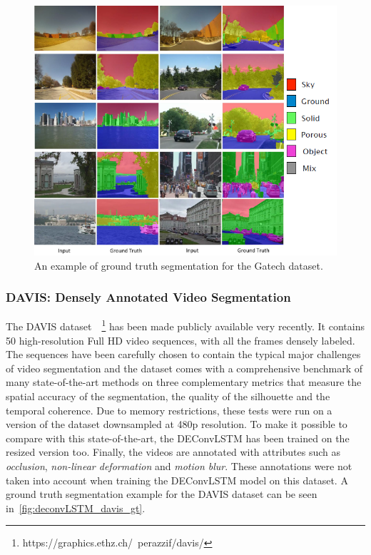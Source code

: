 \begin{figure}[t]
    \centering
    \includegraphics[width=\columnwidth]{img/deconvLSTM/gatech_gt.png}
    \caption{An example of ground truth segmentation for the Gatech dataset.}
    \label{fig:deconvLSTM_gatech_gt}
\end{figure}

\subsubsection{DAVIS: Densely Annotated Video Segmentation}
\label{sec:deconvLSTM_davis}
The DAVIS dataset~\cite{Perazzi2016}~\footnote{
https://graphics.ethz.ch/~perazzif/davis/} has been made publicly available
very recently. It contains 50 high-resolution Full HD video sequences, with
all the frames densely labeled. The sequences have been carefully chosen to
contain the typical major challenges of video segmentation and the dataset
comes with a comprehensive benchmark of many state-of-the-art methods on
three complementary metrics that measure the spatial accuracy of the
segmentation, the quality of the silhouette and the temporal coherence. Due to
memory restrictions, these tests were run on a version of the dataset
downsampled at 480p resolution. To make it possible to compare with this
state-of-the-art, the DEConvLSTM has been trained on the resized version too.
Finally, the videos are annotated with attributes such as \textit{occlusion},
\textit{non-linear deformation} and \textit{motion blur}. These annotations
were not taken into account when training the DEConvLSTM model on this dataset.
A ground truth segmentation example for the DAVIS dataset can be seen
in~\autoref{fig:deconvLSTM_davis_gt}.

